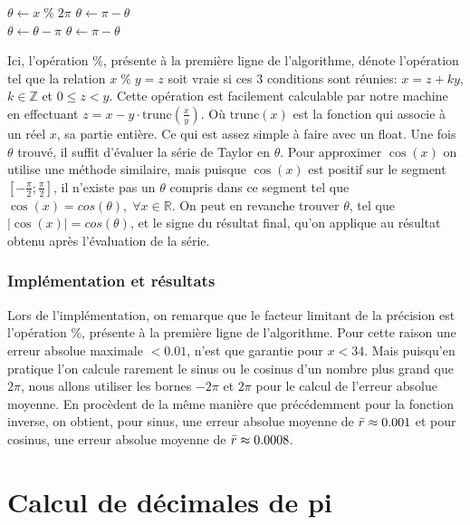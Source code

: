 \documentclass{article}
\begin{document}
\newpage
\begin{algorithm}
\begin{algorithmic}[1]
\State $\theta \gets x\;\%\;2\pi$
    \State $\theta \gets \pi-\theta$
\EndIf
\\
        \State $\theta \gets \theta-\pi$
        \State $\theta \gets \pi-\theta$
    \EndIf
\EndIf
\end{algorithmic}
\end{algorithm}

Ici, l'opération \%, présente à la première ligne de l'algorithme, dénote l'opération tel que la relation $x\;\%\;y = z$ soit vraie si ces 3 conditions sont réunies: $x = z +ky$, $k \in \mathbb{Z}$ et $0\le z<y$. Cette opération est facilement calculable par notre machine en effectuant $z = x-y\cdot\text{trunc}(\frac{x}{y})$. Où $\text{trunc}(x)$ est la fonction qui associe à un réel $x$, sa partie entière. Ce qui est assez simple à faire avec un float.
Une fois $\theta$ trouvé, il suffit d'évaluer la série de Taylor en $\theta$.
Pour approximer $\cos(x)$ on utilise une méthode similaire, mais puisque $\cos(x)$ est positif sur le segment $[-\frac{\pi}{2}; \frac{\pi}{2}]$, il n'existe pas un $\theta$ compris dans ce segment tel que $\cos(x) = cos(\theta),\;\forall x \in \mathbb{R}.$ On peut en revanche trouver $\theta$, tel que $|\cos(x)| = cos(\theta)$, et le signe du résultat final, qu'on applique au résultat obtenu après l'évaluation de la série.
\subsubsection{Implémentation et résultats} 
Lors de l'implémentation, on remarque que le facteur limitant de la précision est l'opération \%, présente à la première ligne de l'algorithme. Pour cette raison une erreur absolue maximale $< 0.01$, n'est que garantie pour $x<34$. Mais puisqu'en pratique l'on calcule rarement le sinus ou le cosinus d'un nombre plus grand que $2\pi$, nous allons utiliser les bornes $-2\pi$ et $2\pi$ pour le calcul de l'erreur absolue moyenne. En procèdent de la même manière que précédemment pour la fonction inverse, on obtient, pour sinus, une erreur absolue moyenne de $\Bar{r}\approx 0.001$ et pour cosinus, une erreur absolue moyenne de $\Bar{r}\approx0.0008$.

\section{Calcul de décimales de pi}
\end{document}
